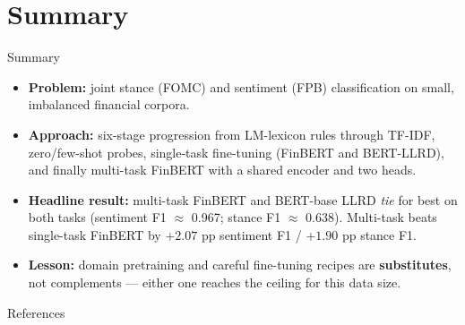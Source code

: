 \documentclass[10pt, aspectratio=169]{beamer}
\begin{document}
\section{Summary}

\begin{frame}{Summary}
    \begin{itemize}\setlength{\itemsep}{0.4em}
        \item \textbf{Problem:} joint stance (FOMC) and sentiment (FPB) classification on small, imbalanced financial corpora.
        \item \textbf{Approach:} six-stage progression from LM-lexicon rules through TF-IDF, zero/few-shot probes, single-task fine-tuning (FinBERT and BERT-LLRD), and finally multi-task FinBERT with a shared encoder and two heads.
        \item \textbf{Headline result:} multi-task FinBERT and BERT-base LLRD \textit{tie} for best on both tasks (sentiment F1 $\approx$ 0.967; stance F1 $\approx$ 0.638). Multi-task beats single-task FinBERT by $+2.07$ pp sentiment F1 / $+1.90$ pp stance F1.
        \item \textbf{Lesson:} domain pretraining and careful fine-tuning recipes are \textbf{substitutes}, not complements --- either one reaches the ceiling for this data size.
    \end{itemize}
\end{frame}

\appendix

\begin{frame}[allowframebreaks]{References}
    \printbibliography[heading=none]
\end{frame}
\end{document}
